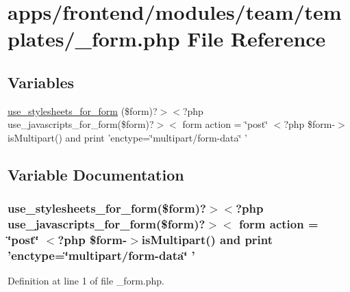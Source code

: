 \hypertarget{frontend_2modules_2team_2templates_2__form_8php}{\section{apps/frontend/modules/team/templates/\-\_\-form.php File Reference}
\label{frontend_2modules_2team_2templates_2__form_8php}
}
\subsection*{Variables}
\begin{DoxyCompactItemize}
\item 
\hyperlink{frontend_2modules_2team_2templates_2__form_8php_a00a269e565f040b15540e79f3fb02a19}{use\-\_\-stylesheets\-\_\-for\-\_\-form} (\$form)?$>$$<$?php use\-\_\-javascripts\-\_\-for\-\_\-form(\$form)?$>$$<$ form action = \char`\"{}post\char`\"{} $<$?php \$form-\/$>$is\-Multipart() and print 'enctype=\char`\"{}multipart/form-\/data\char`\"{} '
\end{DoxyCompactItemize}


\subsection{Variable Documentation}
\hypertarget{frontend_2modules_2team_2templates_2__form_8php_a00a269e565f040b15540e79f3fb02a19}{
\subsubsection[{use\-\_\-stylesheets\-\_\-for\-\_\-form}]{\setlength{\rightskip}{0pt plus 5cm}use\-\_\-stylesheets\-\_\-for\-\_\-form(\$form)?$>$$<$?php use\-\_\-javascripts\-\_\-for\-\_\-form(\$form)?$>$$<$ form action = \char`\"{}post\char`\"{} $<$?php \$form-\/$>$is\-Multipart() and print 'enctype=\char`\"{}multipart/form-\/data\char`\"{} '}}\label{frontend_2modules_2team_2templates_2__form_8php_a00a269e565f040b15540e79f3fb02a19}


Definition at line 1 of file \-\_\-form.\-php.

